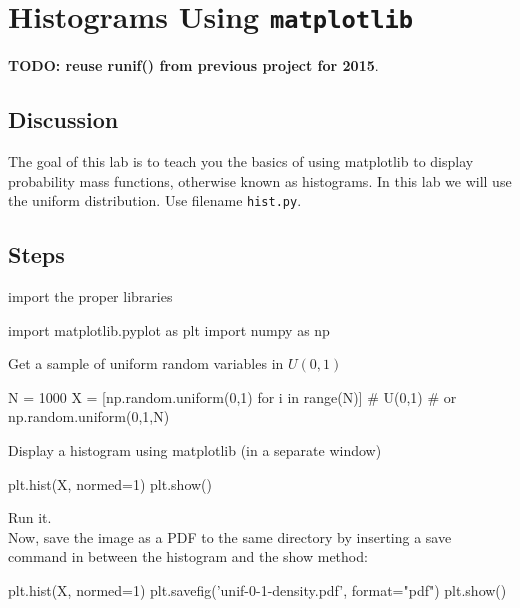 \chapter{Histograms Using {\tt matplotlib}}

{\bf TODO: reuse runif() from previous project for 2015}.

\setcounter{problem}{1}
\section{Discussion}

\begin{fullwidth}

The goal of this lab is to teach you the basics of using matplotlib to display probability mass functions, otherwise known as histograms. In this lab we will use the uniform distribution. Use filename {\tt hist.py}.

\section{Steps}

\step import the proper libraries

\begin{pyverbatim}
import matplotlib.pyplot as plt
import numpy as np
\end{pyverbatim}

\step Get a sample of uniform random variables in $U(0,1)$

\begin{pyverbatim}
N = 1000
X = [np.random.uniform(0,1) for i in range(N)] # U(0,1)
# or np.random.uniform(0,1,N)
\end{pyverbatim}

\step Display a histogram using matplotlib (in a separate window)

\begin{pyverbatim}
plt.hist(X, normed=1)
plt.show()
\end{pyverbatim}

\step Run it. \\

\step Now, save the image as a PDF to the same directory by inserting a save command in between the histogram and the show method:

\begin{pyverbatim}
plt.hist(X, normed=1)
plt.savefig('unif-0-1-density.pdf', format="pdf")
plt.show()
\end{pyverbatim}


\end{fullwidth}
